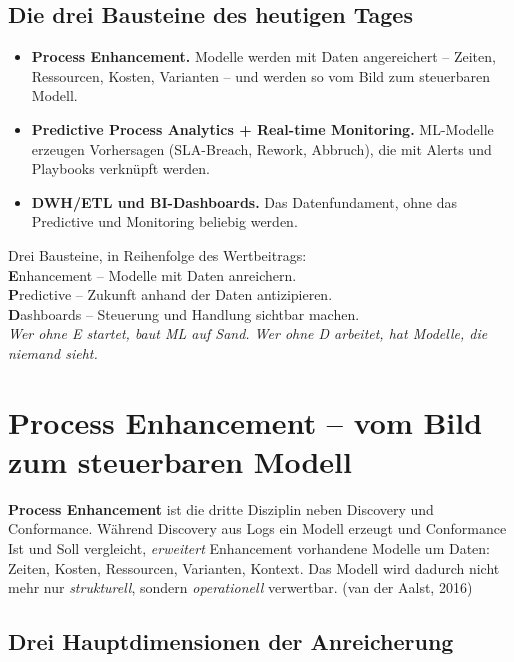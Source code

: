 \documentclass[11pt,a4paper,oneside]{article}
\newcommand{\caveatfontfallback}{\itshape}
\newcommand\caveatfont{\caveatfontfallback}%
\newcommand{\akzent}[1]{{\caveatfont\color{lpAmber}#1}}
\newcommand{\fachbegriff}[1]{\textbf{#1}}
\newcommand{\quelle}[1]{{\footnotesize\color{lpGray}(#1)}}
\begin{document}
\subsection{Die drei Bausteine des heutigen Tages}

\begin{itemize}
  \item \fachbegriff{Process Enhancement.} Modelle werden mit Daten angereichert -- Zeiten, Ressourcen, Kosten, Varianten -- und werden so vom Bild zum steuerbaren Modell.
  \item \fachbegriff{Predictive Process Analytics + Real-time Monitoring.} ML-Modelle erzeugen Vorhersagen (SLA-Breach, Rework, Abbruch), die mit Alerts und Playbooks verknüpft werden.
  \item \fachbegriff{DWH/ETL und BI-Dashboards.} Das Datenfundament, ohne das Predictive und Monitoring beliebig werden.
\end{itemize}

\begin{eselsbox}[Eselsbrücke: \akzent{E-P-D}]
Drei Bausteine, in Reihenfolge des Wertbeitrags:\\[2pt]
\textbf{E}nhancement -- Modelle mit Daten anreichern.\\
\textbf{P}redictive -- Zukunft anhand der Daten antizipieren.\\
\textbf{D}ashboards -- Steuerung und Handlung sichtbar machen.\\[2pt]
\emph{Wer ohne E startet, baut ML auf Sand. Wer ohne D arbeitet, hat Modelle, die niemand sieht.}
\end{eselsbox}

\section{Process Enhancement -- vom Bild zum steuerbaren Modell}

\fachbegriff{Process Enhancement} ist die dritte Disziplin neben Discovery und Conformance. Während Discovery aus Logs ein Modell erzeugt und Conformance Ist und Soll vergleicht, \emph{erweitert} Enhancement vorhandene Modelle um Daten: Zeiten, Kosten, Ressourcen, Varianten, Kontext. Das Modell wird dadurch nicht mehr nur \emph{strukturell}, sondern \emph{operationell} verwertbar. \quelle{van der Aalst, 2016}

\subsection{Drei Hauptdimensionen der Anreicherung}
\end{document}
